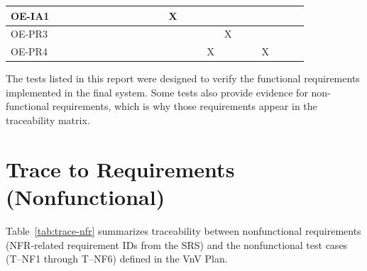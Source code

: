 \documentclass[12pt, titlepage]{article}
\begin{document}
\begin{table}[H]
{\begin{tabular}{|l|c|c|c|c|c|c|c|c|c|c|c|c|c|c|c|c|c|c|c|c|c|c|}
OE-IA1 &  &  &  &  &  &  &  &  &  &  &  & X &  &  &  &  &  &  &  &  &  &  \\ \hline
OE-PR3 &  &  &  &  &  &  &  &  &  &  &  &  &  &  &  & X &  &  &  &  &  &  \\ \hline
OE-PR4 &  &  &  &  &  &  &  &  &  &  &  &  &  &  & X &  &  &  & X &  &  &  \\ \hline

\end{tabular}
}
\end{table}
The tests listed in this report were designed to verify the functional requirements implemented in the final system. Some tests also provide evidence for non-functional requirements, which is why those requirements appear in the traceability matrix.

\section{Trace to Requirements (Nonfunctional)}
\label{sec:trace-nfr}

Table~\ref{tab:trace-nfr} summarizes traceability between nonfunctional
requirements (NFR-related requirement IDs from the SRS) and the nonfunctional
test cases (T--NF1 through T--NF6) defined in the VnV Plan.
\end{document}
